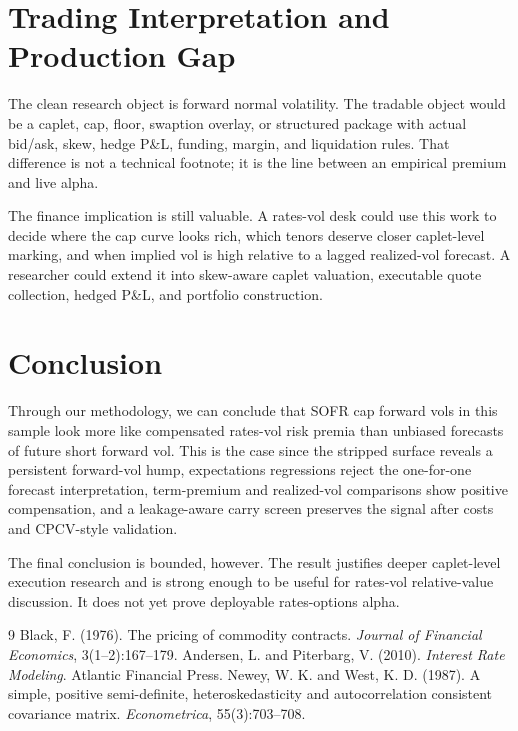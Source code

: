 \documentclass[12pt]{article}
\begin{document}
\section{Trading Interpretation and Production Gap}

The clean research object is forward normal volatility. The tradable object would be a caplet, cap, floor, swaption overlay, or structured package with actual bid/ask, skew, hedge P\&L, funding, margin, and liquidation rules. That difference is not a technical footnote; it is the line between an empirical premium and live alpha.

The finance implication is still valuable. A rates-vol desk could use this work to decide where the cap curve looks rich, which tenors deserve closer caplet-level marking, and when implied vol is high relative to a lagged realized-vol forecast. A researcher could extend it into skew-aware caplet valuation, executable quote collection, hedged P\&L, and portfolio construction.

\section{Conclusion}

Through our methodology, we can conclude that SOFR cap forward vols in this sample look more like compensated rates-vol risk premia than unbiased forecasts of future short forward vol. This is the case since the stripped surface reveals a persistent forward-vol hump, expectations regressions reject the one-for-one forecast interpretation, term-premium and realized-vol comparisons show positive compensation, and a leakage-aware carry screen preserves the signal after costs and CPCV-style validation.

The final conclusion is bounded, however. The result justifies deeper caplet-level execution research and is strong enough to be useful for rates-vol relative-value discussion. It does not yet prove deployable rates-options alpha.

\begin{thebibliography}{9}
 Black, F. (1976). The pricing of commodity contracts. \textit{Journal of Financial Economics}, 3(1--2):167--179.
 Andersen, L. and Piterbarg, V. (2010). \textit{Interest Rate Modeling}. Atlantic Financial Press.
 Newey, W. K. and West, K. D. (1987). A simple, positive semi-definite, heteroskedasticity and autocorrelation consistent covariance matrix. \textit{Econometrica}, 55(3):703--708.
\end{thebibliography}
\end{document}
